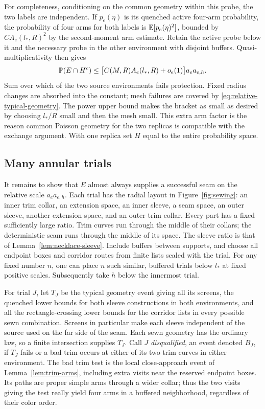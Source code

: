 For completeness, conditioning on the common geometry within this probe,
the two labels are independent.  If $p_e(\eta)$ is its quenched active
four-arm probability, the probability of four arms for both labels is
$\mathbb E[p_e(\eta)^2]$, bounded by
$C A_e(l_*,R)^2$ by the second-moment arm estimate.  Retain the active
probe below it and the necessary probe in the other environment with
disjoint buffers.  Quasi-multiplicativity then gives
\begin{equation}
 \mathbb P(E\cap H^c)
 \leq \bigl[C(M,R)A_e(l_*,R)+o_e(1)\bigr]a_ea_{e,h}.
 \label{eq:inactive-protection}
\end{equation}
Sum over which of the two source environments fails protection.  Fixed
radius changes are absorbed into the constant; mesh failures are covered
by \eqref{eq:relative-typical-geometry}.  The power upper bound makes the
bracket as small as desired by choosing $l_*/R$ small and then the mesh
small.  This extra arm factor is the reason common Poisson geometry for
the two replicas is compatible with the exchange argument.  With one
replica set $H$ equal to the entire probability space.

\subsection{Many annular trials}

It remains to show that $E$ almost always supplies a successful seam on
the relative scale $a_ea_{e,h}$.  Each trial has the radial layout in
Figure~\ref{fig:sewing}: an inner trim collar, an extension space, an inner
sleeve, a seam space, an outer sleeve, another extension space, and an
outer trim collar.  Every part has a fixed sufficiently large ratio.
Trim curves run through the middle of their collars; the deterministic
seam runs through the middle of its space.  The sleeve ratio is that of
Lemma~\ref{lem:necklace-sleeve}.  Include buffers between supports, and
choose all endpoint boxes and corridor routes from finite lists scaled
with the trial.  For any fixed number $n$, one can place $n$ such similar,
buffered trials below $l_*$ at fixed positive scales.  Subsequently take
$h$ below the innermost trial.

For trial $J$, let $T_J$ be the typical geometry event giving all its
screens, the quenched lower bounds for both sleeve constructions in both
environments, and all the
rectangle-crossing lower bounds for the corridor lists in every possible
sewn combination.  Screens in particular make each sleeve independent
of the source used on the far side of the seam.  Each sewn geometry has
the ordinary law, so a finite intersection supplies $T_J$.
Call $J$ \emph{disqualified}, an event denoted $B_J$, if $T_J$ fails or a
bad trim occurs at either of its two trim curves in either environment.
The bad trim test is the local close-approach event of
Lemma~\ref{lem:trim-arms}, including extra visits near the reserved
endpoint boxes.  Its paths are proper simple arms through a wider collar;
thus the two visits giving the test really yield four arms in a buffered
neighborhood, regardless of their color order.

